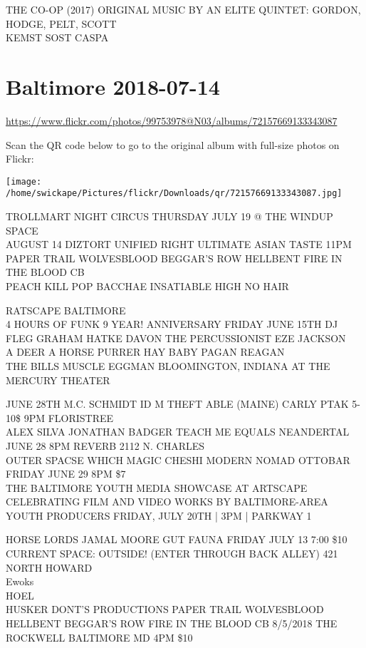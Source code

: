 \documentclass[10pt,letterpaper]{article}
\begin{document}
THE CO{-}OP (2017) ORIGINAL MUSIC BY AN ELITE QUINTET: GORDON, HODGE, PELT, SCOTT\\
KEMST SOST CASPA


\section*{Baltimore 2018-07-14}

\url{https://www.flickr.com/photos/99753978@N03/albums/72157669133343087}

Scan the QR code below to go to the original album with full-size photos on Flickr:

\texttt{[image: /home/swickape/Pictures/flickr/Downloads/qr/72157669133343087.jpg]}


TROLLMART NIGHT CIRCUS THURSDAY JULY 19 @ THE WINDUP SPACE\\
AUGUST 14 DIZTORT UNIFIED RIGHT ULTIMATE ASIAN TASTE 11PM\\
PAPER TRAIL WOLVESBLOOD BEGGAR'S ROW HELLBENT FIRE IN THE BLOOD CB\\
PEACH KILL POP BACCHAE INSATIABLE HIGH NO HAIR

RATSCAPE BALTIMORE\\
4 HOURS OF FUNK 9 YEAR! ANNIVERSARY FRIDAY JUNE 15TH DJ FLEG GRAHAM HATKE DAVON THE PERCUSSIONIST EZE JACKSON\\
A DEER A HORSE PURRER HAY BABY PAGAN REAGAN\\
THE BILLS MUSCLE EGGMAN BLOOMINGTON, INDIANA AT THE MERCURY THEATER

JUNE 28TH M.C. SCHMIDT ID M THEFT ABLE (MAINE) CARLY PTAK 5{-}10\$ 9PM FLORISTREE\\
ALEX SILVA JONATHAN BADGER TEACH ME EQUALS NEANDERTAL JUNE 28 8PM REVERB 2112 N. CHARLES\\
OUTER SPACSE WHICH MAGIC CHESHI MODERN NOMAD OTTOBAR FRIDAY JUNE 29 8PM \$7\\
THE BALTIMORE YOUTH MEDIA SHOWCASE AT ARTSCAPE CELEBRATING FILM AND VIDEO WORKS BY BALTIMORE{-}AREA YOUTH PRODUCERS FRIDAY, JULY 20TH | 3PM | PARKWAY 1

HORSE LORDS JAMAL MOORE GUT FAUNA FRIDAY JULY 13 7:00 \$10 CURRENT SPACE: OUTSIDE!  (ENTER THROUGH BACK ALLEY) 421 NORTH HOWARD\\
Ewoks\\
HOEL\\
HUSKER DONT'S PRODUCTIONS PAPER TRAIL WOLVESBLOOD HELLBENT BEGGAR'S ROW FIRE IN THE BLOOD CB 8/5/2018 THE ROCKWELL BALTIMORE MD 4PM \$10
\end{document}
